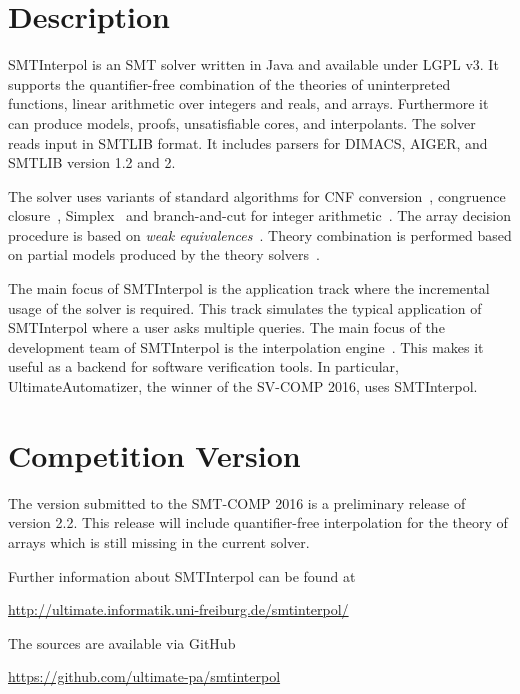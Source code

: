 \documentclass{article}
\title{\SI\\{\large Version \version}}
\author{Jochen Hoenicke, Tanja Schindler\\
  University of Freiburg\\
  \texttt{\{hoenicke,schindle\}@informatik.uni-freiburg.de}}
\date{\today}
\newcommand\SI{SMTInterpol\xspace}
\begin{document}
\maketitle
\section*{Description}
\SI is an SMT solver written in Java and available under LGPL v3.  It supports
the quantifier-free combination of the theories of uninterpreted functions,
linear arithmetic over integers and reals, and arrays.  Furthermore it can
produce models, proofs, unsatisfiable cores, and interpolants.  The solver
reads input in SMTLIB format.  It includes parsers for DIMACS, AIGER, and
SMTLIB version 1.2 and 2.

The solver uses variants of standard algorithms for CNF
conversion~\cite{DBLP:journals/jsc/PlaistedG86}, congruence
closure~\cite{DBLP:conf/rta/NieuwenhuisO05}, Simplex~\cite{DBLP:conf/cav/DutertreM06} and
branch-and-cut for integer arithmetic~\cite{DBLP:conf/cav/ChristH15,DBLP:conf/cav/DilligDA09}.
The array decision procedure is based on \emph{weak equivalences}~\cite{DBLP:conf/frocos/ChristH15}.
Theory combination is performed based on partial models produced by the theory
solvers~\cite{DBLP:journals/entcs/MouraB08}.

The main focus of \SI is the application track where the incremental
usage of the solver is required.  This track simulates the typical
application of \SI where a user asks multiple queries.  The main focus
of the development team of \SI is the interpolation
engine~\cite{DBLP:conf/tacas/ChristHN13}.  This makes it useful as a
backend for software verification tools.  In particular,
Ultimate\-Automatizer, the winner of the SV-COMP 2016, uses \SI.

\section*{Competition Version}
The version submitted to the SMT-COMP 2016 is a preliminary release of version
2.2.  This release will include quantifier-free interpolation for the theory
of arrays which is still missing in the current solver.

Further information about \SI can be found at
\begin{center}
  \url{http://ultimate.informatik.uni-freiburg.de/smtinterpol/}
\end{center}
The sources are available via GitHub
\begin{center}
  \url{https://github.com/ultimate-pa/smtinterpol}
\end{center}
\end{document}
